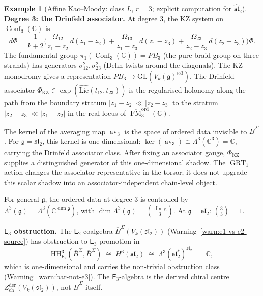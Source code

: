 \documentclass[11pt,reqno]{amsart}
\theoremstyle{definition}
\newtheorem{example}[theorem]{Example}
\theoremstyle{remark}
\newcommand{\HH}{\mathrm{HH}}
\newcommand{\Etwo}{\mathsf{E}_{2}}
\providecommand{\Ethree}{\mathsf{E}_{3}}
\newcommand{\Lie}{\mathrm{Lie}}
\DeclareMathOperator{\Conf}{Conf}
\DeclareMathOperator{\FM}{FM}
\DeclareMathOperator{\av}{av}
\DeclareMathOperator{\GRT}{GRT}
\newcommand{\fg}{\mathfrak{g}}
\newcommand{\BarSig}{\overline{B}^{\Sigma}}
\newcommand{\CC}{\mathbb{C}}
\numberwithin{equation}{section}
\begin{document}
\begin{example}[Affine Kac--Moody: class $L$, $r = 3$;
explicit computation for $\widehat{\mathfrak{sl}}_2$]
\smallskip
\noindent\textbf{Degree 3: the Drinfeld associator.}
At degree $3$, the KZ system on $\Conf_3(\CC)$ is
\begin{equation}\label{eq:kz-3pt}
  d\Phi = \frac{1}{k + 2}
  \biggl(\frac{\Omega_{12}}{z_1 - z_2}\,d(z_1 - z_2)
  + \frac{\Omega_{13}}{z_1 - z_3}\,d(z_1 - z_3)
  + \frac{\Omega_{23}}{z_2 - z_3}\,d(z_2 - z_3)
  \biggr)\Phi.
\end{equation}
The fundamental group $\pi_1(\Conf_3(\CC)) = PB_3$
(the pure braid group on three strands) has generators
$\sigma_{12}^2, \sigma_{23}^2$ (Dehn twists around the
diagonals). The KZ monodromy gives a representation
$PB_3 \to \mathrm{GL}(V_k(\fg)^{\otimes 3})$.
The Drinfeld associator
$\Phi_{\mathrm{KZ}} \in
\exp(\widehat{\Lie}(t_{12}, t_{23}))$ is the regularised
holonomy along the path from the boundary stratum
$|z_1 - z_2| \ll |z_2 - z_3|$ to the stratum
$|z_2 - z_3| \ll |z_1 - z_2|$ in the real locus of
$\overline{\FM}_3^{\mathrm{ord}}(\CC)$.

The kernel of the averaging map $\av_3$ is the space of
ordered data invisible to $\BarSig$. For
$\fg = \mathfrak{sl}_2$, this kernel is one-dimensional:
$\ker(\av_3) \cong \Lambda^3(\CC^3) = \CC$, carrying the
Drinfeld associator class. After fixing an associator gauge,
$\Phi_{\mathrm{KZ}}$ supplies a distinguished generator of this
one-dimensional shadow. The $\GRT_1$ action changes the associator
representative in the torsor; it does not upgrade this scalar
shadow into an associator-independent chain-level object.

For general $\fg$, the ordered data at degree $3$ is
controlled by
$\Lambda^3(\fg) = \Lambda^3(\CC^{\dim\fg})$, with
$\dim \Lambda^3(\fg) = \binom{\dim\fg}{3}$.
At $\fg = \mathfrak{sl}_2$: $\binom{3}{3} = 1$.

\smallskip
\noindent\textbf{$\Ethree$ obstruction.}
The $\Etwo$-coalgebra $\BarSig(V_k(\mathfrak{sl}_2))$
(Warning~\ref{warn:e1-vs-e2-source}) has obstruction to
$\Ethree$-promotion in
\begin{equation}\label{eq:e3-obstruction-km}
  \HH^3_{\Etwo}(\BarSig, \BarSig)
  \;\cong\; H^3(\mathfrak{sl}_2)
  \;\cong\; \Lambda^3(\mathfrak{sl}_2^*)^{\mathfrak{sl}_2}
  \;=\; \CC,
\end{equation}
which is one-dimensional and carries the non-trivial
obstruction class (Warning~\ref{warn:bar-not-e3}).
The $\Ethree$-algebra is the derived chiral centre
$Z^{\mathrm{der}}_{\mathrm{ch}}(V_k(\mathfrak{sl}_2))$,
not $\BarSig$ itself.


\end{example}
\end{document}
